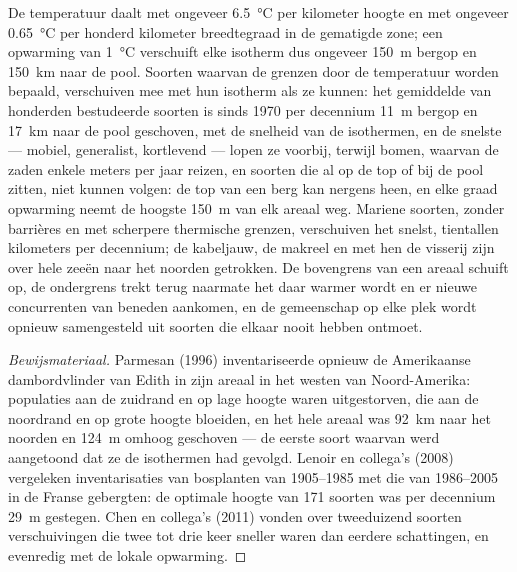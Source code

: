 \begin{proposition}\label{prop:b2:global-change:range}
De temperatuur daalt met ongeveer \qty{6.5}{\celsius} per kilometer
hoogte en met ongeveer \qty{0.65}{\celsius} per honderd kilometer
breedtegraad in de gematigde zone; een opwarming van \qty{1}{\celsius}
verschuift elke isotherm dus ongeveer \qty{150}{m} bergop en
\qty{150}{km} naar de pool. Soorten waarvan de grenzen door de temperatuur
worden bepaald, verschuiven mee met hun isotherm als ze kunnen: het gemiddelde
van honderden bestudeerde soorten is sinds 1970 per decennium \qty{11}{m}
bergop en \qty{17}{km} naar de pool geschoven, met de snelheid van de
isothermen, en de snelste --- mobiel, generalist, kortlevend --- lopen ze
voorbij, terwijl bomen, waarvan de zaden enkele meters per jaar reizen, en
soorten die al op de top of bij de pool zitten, niet kunnen volgen: de top van
een berg kan nergens heen, en elke graad opwarming neemt de hoogste
\qty{150}{m} van elk areaal weg. Mariene soorten, zonder barrières en met
scherpere thermische grenzen, verschuiven het snelst, tientallen kilometers per
decennium; de kabeljauw, de makreel en met hen de visserij zijn over hele zeeën
naar het noorden getrokken. De bovengrens van een areaal schuift op, de
ondergrens trekt terug naarmate het daar warmer wordt en er nieuwe
concurrenten van beneden aankomen, en de gemeenschap op elke plek wordt
opnieuw samengesteld uit soorten die elkaar nooit hebben ontmoet.
\end{proposition}
\begin{proof}[Bewijsmateriaal]
Parmesan (1996) inventariseerde opnieuw de Amerikaanse dambordvlinder van Edith
in zijn areaal in het westen van Noord-Amerika: populaties aan de
zuidrand en op lage hoogte waren uitgestorven, die aan de noordrand
en op grote hoogte bloeiden, en het hele areaal was
\qty{92}{km} naar het noorden en \qty{124}{m} omhoog geschoven --- de eerste
soort waarvan werd aangetoond dat ze de isothermen had gevolgd. Lenoir en
collega's (2008) vergeleken inventarisaties van bosplanten van 1905--1985 met
die van 1986--2005 in de Franse gebergten: de optimale hoogte van 171 soorten
was per decennium \qty{29}{m} gestegen. Chen en collega's (2011) vonden over
tweeduizend soorten verschuivingen die twee tot drie keer sneller waren dan
eerdere schattingen, en evenredig met de lokale opwarming.
\end{proof}

